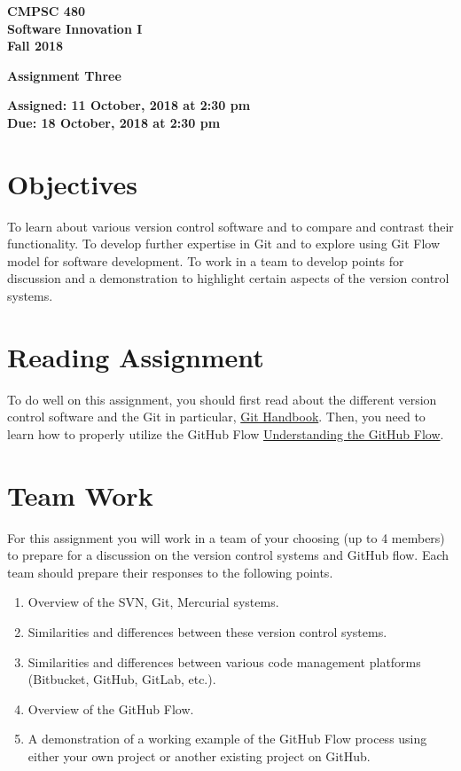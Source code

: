 \documentclass[11pt]{article}
\newcommand{\assignmentduedate}{18 October}
\newcommand{\assignmentassignedate}{ 11 October}
\newcommand{\assignmentnumber}{Three}
\newcommand{\labyear}{2018}
\newcommand{\labtime}{2:30 pm}
\newcommand{\assigneddate}{Assigned:  \assignmentassignedate, \labyear{} at \labtime{}}
\newcommand{\duedate}{Due:  \assignmentduedate, \labyear{} at \labtime{}}
\newcommand{\labtitle}[1]
{
  \begin{center}
    \begin{center}
      \bf
      CMPSC 480 \\ Software Innovation I\\
      Fall 2018\\
      \medskip
    \end{center}
    \bf
    #1
  \end{center}
}
\begin{document}
\thispagestyle{empty}

\labtitle{Assignment \assignmentnumber{} }
\begin{center} \textbf{ \assigneddate{} \\ \duedate{} } \end{center} 
\noindent \textbf{ }

\section*{Objectives}

To learn about various version control software and to compare and contrast their functionality. To develop further expertise in Git and to explore using Git Flow model for software development. To work in a team to develop points for discussion and a demonstration to highlight certain aspects of the  version control systems.

\section*{Reading Assignment}

To do well on this assignment, you
should first read about the different version control software and the Git in particular, \href{https://guides.github.com/introduction/git-handbook/}{Git Handbook}.
Then, you need to learn how to properly utilize the GitHub Flow  \href{
https://guides.github.com/introduction/flow/}{Understanding the GitHub Flow}.

\section*{Team Work}
For this assignment you will work in a team of your choosing (up to 4 members) to prepare for a discussion on the version control systems and GitHub flow. Each team should prepare their responses to the following points. 

\begin{enumerate}
	\item Overview of the SVN, Git, Mercurial systems.
	\item Similarities and differences between these version control systems.
	\item Similarities and differences between various code management platforms (Bitbucket, GitHub, GitLab, etc.).
	\item Overview of the GitHub Flow.
	\item A demonstration of a working example of the GitHub Flow process using either your own project or another existing project on GitHub.
\end{enumerate} 
\end{document}

